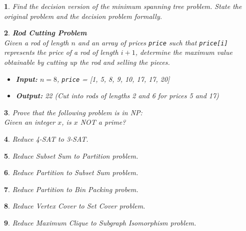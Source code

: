 \documentclass[%
addpoints]{exam}
\theoremstyle{problem}
\newtheorem{p}{}
\begin{document}
\begin{p}
Find the decision version of the minimum spanning tree problem. State the original problem and the decision problem formally.
\hfill \end{p}

\begin{p} 
\textbf{Rod Cutting Problem}\\
Given a rod of length $n$ and an array of prices \texttt{price} such that \texttt{price[i]} represents the price of a rod of length $i+1$, determine the maximum value obtainable by cutting up the rod and selling the pieces.
\begin{itemize}
  \item \textbf{Input:} $n = 8$, \texttt{price} = [1, 5, 8, 9, 10, 17, 17, 20]
  \item \textbf{Output:} 22 (Cut into rods of lengths 2 and 6 for prices 5 and 17)
\end{itemize}
\hfill \end{p}

\begin{p}
Prove that the following problem is in NP:\\ 
\hspace{9pt}Given an integer $x$, is $x$ NOT a prime?
\hfill \end{p}

\begin{p} 
Reduce 4-SAT to 3-SAT.
\hfill \end{p}

\begin{p}
Reduce Subset Sum to Partition problem.
\hfill \end{p}

\begin{p} 
Reduce Partition to Subset Sum problem.
\hfill \end{p}

\begin{p}
Reduce Partition to Bin Packing probem.
\hfill \end{p}

\begin{p}
Reduce Vertex Cover to Set Cover problem.
\hfill \end{p}

\begin{p}
Reduce Maximum Clique to Subgraph Isomorphism problem.
\hfill \end{p}
\end{document}
